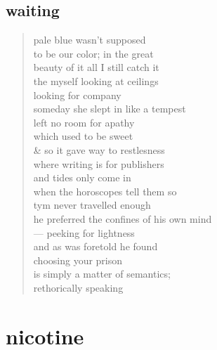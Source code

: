 \documentclass[11pt]{article}
\begin{document}
\subsection{waiting}
\label{sec:org43a36a5}
\begin{verse}
pale blue wasn't supposed\\
to be our color; in the great\\
beauty of it all I still catch it\\
the myself looking at ceilings\\
looking for company\\
\vspace*{1em}
someday she slept  in like a tempest\\
left no room for apathy\\
which used to be sweet\\
\& so it gave way to restlesness\\
where writing is for publishers\\
and tides only come in\\
when the horoscopes tell them so\\
\vspace*{1em}
tym never travelled enough\\
he preferred the confines of his own mind\\
--- peeking for lightness\\
and as was foretold he found\\
choosing your prison\\
is simply a matter of semantics;\\
rethorically speaking\\
\end{verse}
\section{nicotine}
\label{sec:orgb12ad37}
\end{document}
